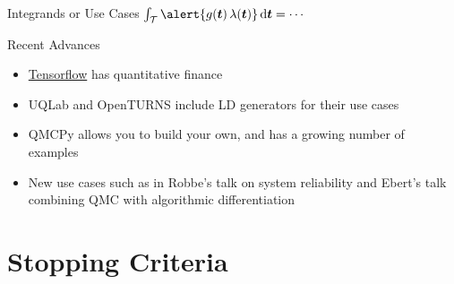 \documentclass[11pt,compress,xcolor={usenames,dvipsnames},aspectratio=169]{beamer}
\begin{document}
\begin{frame}{Integrands or Use Cases $	\int_{\ct} \alert{g(\vt) \, \lambda(\vt)} \, \dif \vt = \cdots$}
	
	\begin{multicols}{2}
		{\Large \alert{Recent Advances}}
		\begin{itemize}
			
			\item \href{https://github.com/google/tf-quant-finance}{\alert{Tensorflow}} has quantitative finance 
			
			\item UQLab and OpenTURNS include LD generators for their use cases
			
			\item QMCPy allows you to build your own, and has a growing number of examples

			\item New use cases such as in Robbe's talk \cite{Vro19a} on system reliability and Ebert's talk combining QMC with algorithmic differentiation
			
		\end{itemize}
		
		\columnbreak
		
		
	\end{multicols}
\end{frame}

	
\section{Stopping Criteria}
\end{document}
